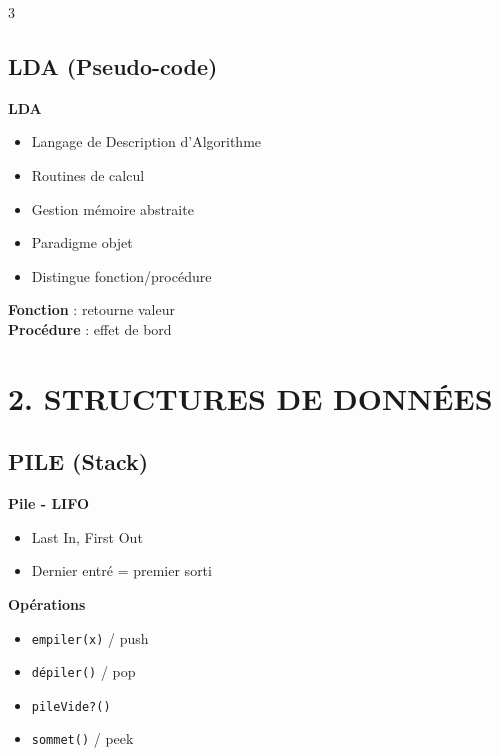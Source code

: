 \documentclass[10pt,a4paper,landscape]{article}
\begin{document}
\begin{multicols}{3}
\subsection*{LDA (Pseudo-code)}

\begin{defbox}
\textbf{LDA}
\begin{itemize}
\item Langage de Description d'Algorithme
\item Routines de calcul
\item Gestion mémoire abstraite
\item Paradigme objet
\item Distingue fonction/procédure
\end{itemize}
\end{defbox}

\begin{importbox}
\textbf{Fonction} : retourne valeur\\
\textbf{Procédure} : effet de bord
\end{importbox}

\columnbreak

\section*{\color{titrebleu}2. STRUCTURES DE DONNÉES}

\subsection*{PILE (Stack)}

\begin{defbox}
\textbf{Pile - LIFO}
\begin{itemize}
\item Last In, First Out
\item Dernier entré = premier sorti
\end{itemize}
\end{defbox}

\begin{algobox}
\textbf{Opérations}
\begin{itemize}
\item \texttt{empiler(x)} / push
\item \texttt{dépiler()} / pop
\item \texttt{pileVide?()}
\item \texttt{sommet()} / peek
\end{itemize}
\end{algobox}


\end{multicols}
\end{document}

